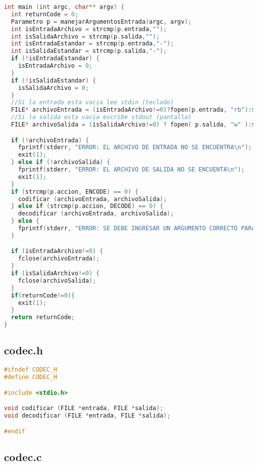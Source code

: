 \documentclass[a4paper,11pt, margin=1in]{article}
\begin{document}
\begin{lstlisting}[language=C,breaklines=true]
int main (int argc, char** argv) {
  int returnCode = 0;
  Parametro p = manejarArgumentosEntrada(argc, argv);
  int isEntradaArchivo = strcmp(p.entrada,"");
  int isSalidaArchivo = strcmp(p.salida,"");
  int isEntradaEstandar = strcmp(p.entrada,"-");
  int isSalidaEstandar = strcmp(p.salida,"-");
  if (!isEntradaEstandar) {
    isEntradaArchivo = 0;
  }
  if (!isSalidaEstandar) {
    isSalidaArchivo = 0;
  }
  //Si la entrada esta vacia lee stdin (teclado)
  FILE* archivoEntrada = (isEntradaArchivo!=0)?fopen(p.entrada, "rb"):stdin;
  //Si la salida esta vacia escribe stdout (pantalla)
  FILE* archivoSalida = (isSalidaArchivo!=0) ? fopen( p.salida, "w" ):stdout;

  if (!archivoEntrada) {
    fprintf(stderr, "ERROR: EL ARCHIVO DE ENTRADA NO SE ENCUENTRA\n");
    exit(1);
  } else if (!archivoSalida) {
    fprintf(stderr, "ERROR: EL ARCHIVO DE SALIDA NO SE ENCUENTA\n");
    exit(1);
  }
  if (strcmp(p.accion, ENCODE) == 0) {
    codificar (archivoEntrada, archivoSalida);
  } else if (strcmp(p.accion, DECODE) == 0) {
    decodificar (archivoEntrada, archivoSalida);
  } else {
    fprintf(stderr, "ERROR: SE DEBE INGRESAR UN ARGUMENTO CORRECTO PARA LA OPCION\n");
  }

  if (isEntradaArchivo!=0) {
    fclose(archivoEntrada);
  }
  if (isSalidaArchivo!=0) {
    fclose(archivoSalida);
  }
  if(returnCode!=0){
    exit(1);
  }
  return returnCode;
}
\end{lstlisting}

\subsection{codec.h}

\begin{lstlisting}[language=C,breaklines=true]
#ifndef CODEC_H
#define CODEC_H

#include <stdio.h>

void codificar (FILE *entrada, FILE *salida);
void decodificar (FILE *entrada, FILE *salida);

#endif
\end{lstlisting}

\subsection{codec.c}
\end{document}
